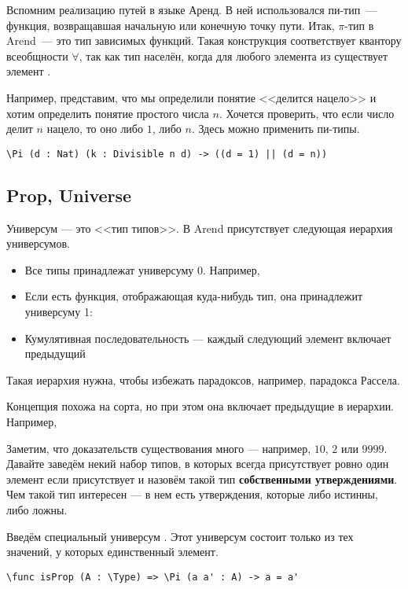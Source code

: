 \medskip
Вспомним реализацию путей в языке Аренд. В ней использовался пи-тип~--- функция, возвращавшая начальную или конечную точку пути.
Итак, $\pi$-тип в Arend~--- это тип зависимых функций. Такая конструкция соответствует квантору всеобщности $\forall$, так как
тип  населён, когда для любого элемента  из  существует элемент . 

Например, представим, что мы определили понятие <<делится нацело>> и хотим определить понятие простого числа $n$.
Хочется проверить, что если число делит $n$ нацело, то оно либо $1$, либо $n$. Здесь можно применить пи-типы.
\begin{verbatim}
\Pi (d : Nat) (k : Divisible n d) -> ((d = 1) || (d = n))
\end{verbatim}

\subsection{Prop, Universe}

Универсум --- это <<тип типов>>. В Arend присутствует следующая иерархия универсумов.

\begin{itemize}
    \item Все типы принадлежат универсуму 0. Например, 
    \item Если есть функция, отображающая куда-нибудь тип, она принадлежит универсуму 1: 
    \item Кумулятивная последовательность --- каждый следующий элемент включает предыдущий
\end{itemize}

Такая иерархия нужна, чтобы избежать парадоксов, например, парадокса Рассела.

Концепция похожа на сорта, но при этом она включает предыдущие в иерархии. Например, 

\medskip
Заметим, что доказательств существования  много --- например, $10$, $2$ или $9999$.
Давайте заведём некий набор типов, в которых всегда присутствует ровно один элемент если присутствует и назовём такой тип \textbf{собственными утверждениями}.
Чем такой тип интересен --- в нем есть утверждения, которые либо истинны, либо ложны.

Введём специальный универсум . Этот универсум состоит только из тех значений, у которых единственный элемент.

\begin{verbatim}
\func isProp (A : \Type) => \Pi (a a' : A) -> a = a'
\end{verbatim}

